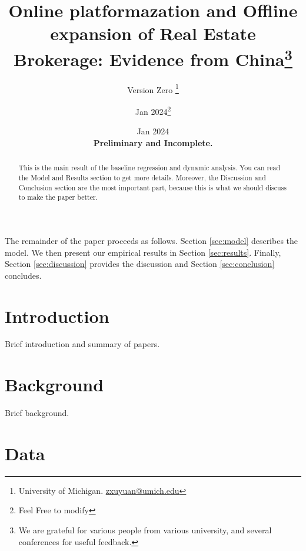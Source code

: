 \documentclass[12pt]{article}
\title{ \vspace*{-2.5cm} \hspace*{-0.5cm}Online platformazation and Offline expansion of Real Estate Brokerage: Evidence from China\footnote{
We are grateful for various people from various university, and several conferences for useful feedback. 
}}
\author{Version Zero \thanks{University of Michigan. \href{mailto:zxuyuan@umich.edu}{zxuyuan@umich.edu}} \and Jan 2024\thanks{Feel Free to modify} }
\date{ \vspace*{0.5cm} Jan 2024\\
\textbf{Preliminary and Incomplete.}
}
\begin{document}
\bgroup
\let\footnoterule\relax

\begin{singlespace}
\maketitle


\begin{abstract}
    \noindent This is the main result of the baseline regression and dynamic analysis. You can read the Model and Results section to get more details. Moreover, the Discussion and Conclusion section are the most important part, because this is what we should discuss to make the paper better.
  \end{abstract}
\end{singlespace}
\thispagestyle{empty}

\clearpage
\egroup
\setcounter{page}{1}



\noindent 

The remainder of the paper proceeds as follows. Section \ref{sec:model} describes the model. We then present our
empirical results in Section \ref{sec:results}. Finally, Section \ref{sec:discussion} provides the discussion and Section \ref{sec:conclusion} concludes. 

\section{Introduction \label{sec:introduction}}

Brief introduction and summary of papers.

\section{Background \label{sec:background}}

Brief background.

\section{Data \label{sec:data}}
\end{document}
